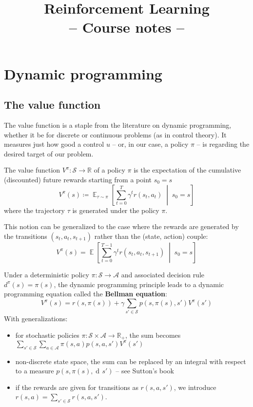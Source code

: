 \documentclass[12pt]{report}
\title{
{\sffamily\Huge
	\textbf{Reinforcement Learning}\\
	{\bluefont-- Course notes --}
}
}
\date{}
\newcommand\RR{\mathbb{R}}
\newcommand{\scalemid}{\;\middle|\;}
\DeclareMathOperator{\EE}{\mathbb{E}}
\newcommand{\der}{\operatorname{d\!}{}}
\newcommand{\calA}{\mathcal{A}}
\newcommand{\calS}{\mathcal{S}}
\newcommand{\bluefont}{\color{Blue}}
\begin{document}
\maketitle


\chapter{Dynamic programming}

\section{The value function}

The value function is a staple from the literature on dynamic programming, whether it be for discrete or continuous problems (as in control theory). It measures just how good a control $u$ -- or, in our case, a policy $\pi$ -- is regarding the desired target of our problem.


\begin{defn}
The value function $V^\pi\colon \calS \to \RR$ of a policy $\pi$ is the expectation of the cumulative (discounted) future rewards starting from a point $s_0 = s$
\begin{equation}\label{eq:ValueFunctionDefn}
	V^\pi(s) \coloneqq
	\EE_{\tau\sim\pi}\left[
	\sum_{t=0}^T \gamma^t r(s_t, a_t)
	\scalemid s_0 = s
	\right]
\end{equation}
where the trajectory $\tau$ is generated under the policy $\pi$.
\end{defn}

This notion can be generalized to the case where the rewards are generated by the transitions $(s_t, a_t, s_{t+1})$ rather than the (state, action) couple:
\[
	V^\pi(s) = \EE\left[
	\sum_{t=0}^{T-1} \gamma^t r(s_t, a_t, s_{t+1})
	\scalemid s_0 = s
	\right]
\]

Under a deterministic policy $\pi\colon \calS \to \calA$ and associated decision rule $d^\pi(s) = \pi(s)$, the dynamic programming principle leads to a dynamic programming equation called the \textbf{\bluefont Bellman equation}:
\begin{equation}
	V^\pi(s) = r(s, \pi(s)) + \gamma\sum_{s'\in\calS} p(s, \pi(s), s')V^\pi(s')
\end{equation}
With generalizations:
\begin{itemize}
	\item for stochastic policies $\pi\colon \calS\times\calA \to \RR_+$, the sum becomes $\sum_{s'\in\calS} \sum_{a\in\calA} \pi(s,a) p(s,a,s')V^\pi(s')$
	\item non-discrete state space, the sum can be replaced by an integral with respect to a measure $p(s,\pi(s),\der s')$ -- see Sutton's book \cite{Sutton1998}
	\item if the rewards are given for transitions as $r(s,a,s')$, we introduce $r(s,a) = \sum_{s'\in\calS}r(s,a,s')$.
\end{itemize}
\end{document}

